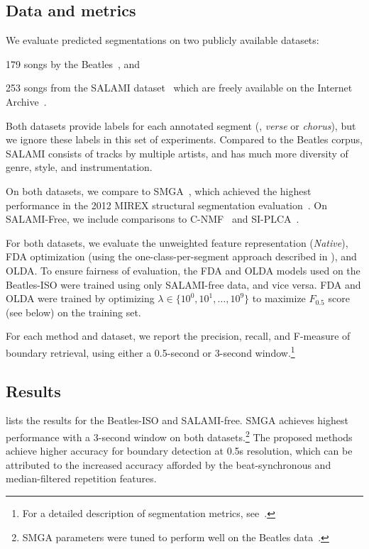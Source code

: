 \documentclass{article}
\begin{document}
\subsection{Data and metrics}
We evaluate predicted segmentations on two publicly available datasets:
\begin{description}\addtolength{\itemsep}{-0.25\baselineskip}%
\item[Beatles-ISO] 179 songs by the Beatles~\cite{harte2010towards,isophonicsbeatles}, and
\item[SALAMI-free] 253 songs from the SALAMI dataset~\cite{smith2011design} which are freely available on the 
Internet Archive~\cite{nieto2013convex}.
\end{description}
Both datasets provide labels for each annotated segment (\eg, \emph{verse} or \emph{chorus}), but we ignore these
labels in this set of experiments. Compared to the Beatles corpus, SALAMI consists of tracks by multiple artists, 
and has much more diversity of genre, style, and instrumentation.

On both datasets, we compare to SMGA~\cite{serra2012unsupervised}, which achieved the
highest performance in the 2012 MIREX structural segmentation evaluation~\cite{Downie2008}.
On SALAMI-Free, we include comparisons to C-NMF~\cite{nieto2013convex} and SI-PLCA~\cite{weiss2011unsupervised}.

For both datasets, we evaluate the unweighted feature representation (\emph{Native}), FDA optimization (using the
one-class-per-segment approach described in ), and OLDA.\@
To ensure fairness of evaluation, the FDA and OLDA models used on the Beatles-ISO were trained using only
SALAMI-free data, and vice versa.  FDA and OLDA were trained by optimizing $\lambda \in \{10^0, 10^1, \dots, 10^9\}$
to maximize $F_{0.5}$ score (see below) on the training set.

For each method and dataset, we report the precision, recall, and F-measure of boundary retrieval, using either a 0.5-second or 3-second window.\footnote{
For a detailed description of segmentation metrics, see~\cite{mirexstructure}.}


\subsection{Results}
\label{sec:results}

% 

 lists the results for the Beatles-ISO and SALAMI-free.
SMGA achieves highest performance with a 3-second window on both datasets.\footnote{SMGA parameters were tuned to perform well on the Beatles data~\cite{serra2012unsupervised}.}\@
The proposed methods achieve higher accuracy for boundary detection at 0.5s resolution, which can be attributed to the increased
accuracy afforded by the beat-synchronous and median-filtered repetition features.  
\end{document}
